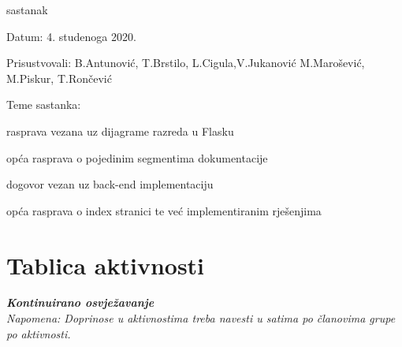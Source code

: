 \begin{packed_enum}
			\item  sastanak
			\item[] \begin{packed_item}
				\item Datum: 4. studenoga 2020.
				\item Prisustvovali: B.Antunović, T.Brstilo, L.Cigula,V.Jukanović M.Marošević, M.Piskur, T.Rončević
				\item Teme sastanka:
				\begin{packed_item}
					\item  rasprava vezana uz dijagrame razreda u Flasku
					\item  opća rasprava o pojedinim segmentima dokumentacije
					\item  dogovor vezan uz back-end implementaciju
					\item  opća rasprava o index stranici te već implementiranim rješenjima
				\end{packed_item}
			\end{packed_item}	
			
			
		\end{packed_enum}
		
		\eject
		\section*{Tablica aktivnosti}
		
			\textbf{\textit{Kontinuirano osvježavanje}}\\
			
			 \textit{Napomena: Doprinose u aktivnostima treba navesti u satima po članovima grupe po aktivnosti.}
					
						
			
